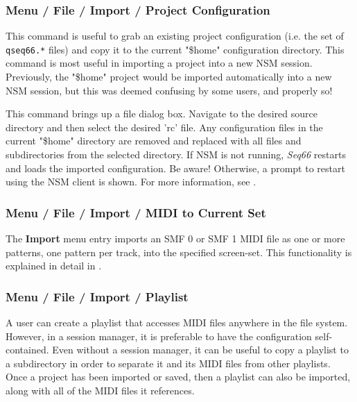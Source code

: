 \subsubsection{Menu / File / Import / Project Configuration}
\label{subsubsec:menu_file_import_project_configuration}

   This command is useful to grab an existing project configuration
   (i.e. the set of \texttt{qseq66.*} files) and copy it
   to the current "\$home" configuration directory.
   This command is most useful in importing a project into a new
   NSM session.
   Previously, the "\$home" project would be imported automatically
   into a new NSM session, but this was deemed confusing by some users, and
   properly so!

   This command brings up a file dialog box. Navigate to the desired
   source directory and then select the desired 'rc' file.
   Any configuration files in the current "\$home" directory are removed
   and replaced with all files and subdirectories from the selected
   directory.
   If NSM is not running, \textsl{Seq66} restarts and loads the
   imported configuration.
   Be aware!
   Otherwise, a prompt to restart using the NSM client is shown.
   For more information, see
   .

\subsubsection{Menu / File / Import / MIDI to Current Set}
\label{subsubsec:menu_file_import}

   The \textbf{Import} menu entry imports an SMF 0
   or SMF 1 MIDI file as one or more patterns, one pattern per track,
   into the specified screen-set.
   This functionality is explained in detail in
   .

\subsubsection{Menu / File / Import / Playlist}
\label{subsubsec:menu_file_import_playlisMIDI to Current Sett}

   A user can create a playlist that accesses MIDI files anywhere in the file
   system.
   However, in a session manager, it is preferable to have the configuration
   self-contained.
   Even without a session manager, it can be useful to copy a playlist to a
   subdirectory in order to separate it and its MIDI files from other
   playlists.
   Once a project has been imported or saved, then a playlist can also be
   imported, along with all of the MIDI files it references.

